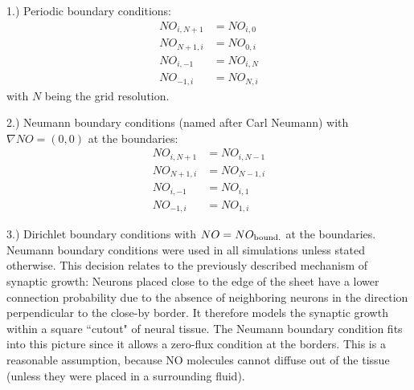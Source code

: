 \documentclass[10pt,a4paper]{article}
\begin{document}
1.) Periodic boundary conditions:
\begin{align}
NO_{i,N+1} &= NO_{i,0} \label{Periodic_Cond_1} \\
NO_{N+1,i} &= NO_{0,i} \label{Periodic_Cond_2} \\
NO_{i,-1} &= NO_{i,N} \label{Periodic_Cond_3} \\
NO_{-1,i} &= NO_{N,i} \label{Periodic_Cond_4}
\end{align}
with $N$ being the grid resolution.

2.) Neumann boundary conditions (named after Carl Neumann) with $\nabla NO = (0,0)$ at the boundaries:
\begin{align}
NO_{i,N+1} &= NO_{i,N-1} \label{Neumann_Cond_1} \\
NO_{N+1,i} &= NO_{N-1,i} \label{Neumann_Cond_2} \\
NO_{i,-1} &= NO_{i,1} \label{Neumann_Cond_3} \\
NO_{-1,i} &= NO_{1,i} \label{Neumann_Cond_4}
\end{align}

3.) Dirichlet boundary conditions with $NO = NO_{\rm bound.}$ at the boundaries.\\
Neumann boundary conditions were used in all simulations unless stated otherwise. This decision relates to the previously described mechanism of synaptic growth: Neurons placed close to the edge of the sheet have a lower connection probability due to the absence of neighboring neurons in the direction perpendicular to the close-by border. It therefore models the synaptic growth within a square ``cutout" of neural tissue. The Neumann boundary condition fits into this picture since it allows a zero-flux condition at the borders. This is a reasonable assumption, because NO molecules cannot diffuse out of the tissue (unless they were placed in a surrounding fluid).
\end{document}

